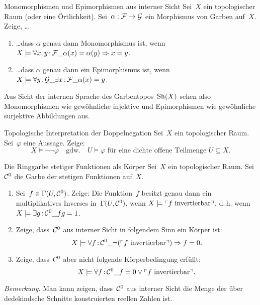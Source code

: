 \documentclass{pizzablatt}
\begin{document}

\begin{aufgabe}{Monomorphismen und Epimorphismen aus interner Sicht}
Sei~$X$ ein topologischer Raum (oder eine Örtlichkeit). Sei~$\alpha : \mathcal{F} \to
\mathcal{G}$ ein Morphismus von Garben auf~$X$. Zeige, \ldots
\begin{enumerate}
\item \ldots dass $\alpha$ genau dann Monomorphismus ist, wenn
$X \models \forall x,y\,{:}\,\mathcal{F}\_ \alpha(x) = \alpha(y) \Rightarrow x = y$.
\item \ldots dass $\alpha$ genau dann ein Epimorphismus ist, wenn
$X \models \forall y\,{:}\,\mathcal{G}\_ \exists x\,{:}\,\mathcal{F}\_ \alpha(x) = y$.
\end{enumerate}
Aus Sicht der internen Sprache des Garbentopos~$\mathrm{Sh}(X)$ sehen also
Monomorphismen wie gewöhnliche injektive und Epimorphismen wie
gewöhnliche surjektive Abbildungen aus.
\end{aufgabe}

\begin{aufgabe}{Topologische Interpretation der Doppelnegation}
Sei~$X$ ein topologischer Raum. Sei~$\varphi$ eine Aussage. Zeige:
\[ X \models \neg\neg\varphi
  \quad\text{gdw.}\quad
  \text{$U \models \varphi$ für eine dichte offene Teilmenge~$U \subseteq X$}. \]
\end{aufgabe}
\vspace{-2em}

\begin{aufgabe}{Die Ringgarbe stetiger Funktionen als Körper}
Sei~$X$ ein topologischer Raum. Sei~$\mathcal{C}^0$ die Garbe der stetigen Funktionen
auf~$X$.
\begin{enumerate}
\item Sei~$f \in \Gamma(U,\mathcal{C}^0)$. Zeige: Die Funktion~$f$ besitzt genau dann
ein multiplikatives Inverses in~$\Gamma(U,\mathcal{C}^0)$, wenn $X \models \ulcorner\text{$f$
invertierbar}\urcorner$, d.\,h. wenn $X \models \exists g\,{:}\,\mathcal{C}^0\_ fg = 1$.
\item Zeige, dass~$\mathcal{C}^0$ aus interner Sicht in folgendem Sinn ein Körper ist:
\[ X \models \forall f\,{:}\,\mathcal{C}^0\_ \neg(\ulcorner\text{$f$ invertierbar}\urcorner)
\Rightarrow f = 0. \]
\item Zeige, dass~$\mathcal{C}^0$ aber nicht folgende Körperbedingung erfüllt:
\[ X \models \forall f\,{:}\,\mathcal{C}^0\_ f = 0 \vee \ulcorner\text{$f$ invertierbar}\urcorner. \]
\end{enumerate}
\emph{Bemerkung.} Man kann zeigen, dass~$\mathcal{C}^0$ aus interner Sicht die Menge der
über dedekindsche Schnitte konstruierten reellen Zahlen ist.
\end{aufgabe}
\end{document}
